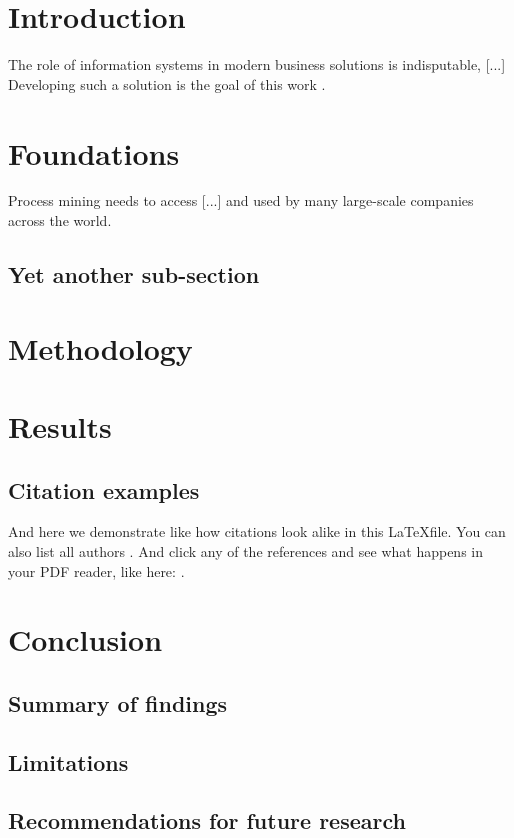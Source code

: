 \newpage\section{Introduction}

The role of information systems in modern business solutions is indisputable, [...] Developing such a solution is the goal of this work \parencite{venkatesh_usability_2014}. 

\lipsum

\newpage\section{Foundations}

Process mining needs to access [...] and used by many large-scale companies \parencite{hoehle_espoused_2015} across the world.

\lipsum

\subsection{Yet another sub-section}

\lipsum

\newpage\section{Methodology}

\lipsum

\newpage\section{Results}

\lipsum

\subsection{Citation examples}

And here we demonstrate like \parencite{hoehle_espoused_2015} how citations look alike in this \LaTeX file. You can also list all authors \parencite{venkatesh_usability_2014}. And click any of the references and see what happens in your PDF reader, like here: \textcite{university_of_arkansas_mobile_2015}.
\lipsum

\newpage
\section{Conclusion}
\lipsum

 \subsection{Summary of findings}

 \lipsum

\subsection{Limitations}
\subsection{Recommendations for future research}